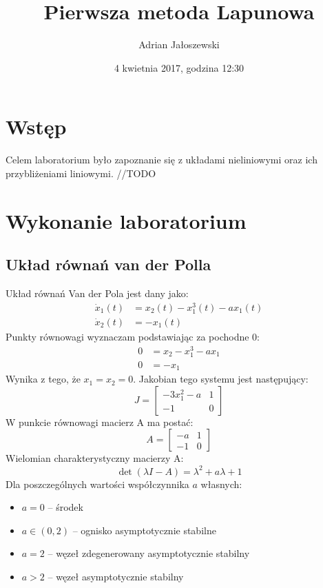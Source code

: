 \documentclass[a4paper, 10pt]{article}
\title{Pierwsza metoda Lapunowa}
\author{Adrian Jałoszewski}
\date{4 kwietnia 2017, godzina 12:30}
\begin{document}
	\maketitle
	\section{Wstęp}
		Celem laboratorium było zapoznanie się z układami nieliniowymi oraz ich przybliżeniami liniowymi. //TODO
	\section{Wykonanie laboratorium}
		\subsection{Układ równań van der Polla}
			Układ równań Van der Pola jest dany jako:
			$$
				\begin{aligned}
					\dot{x}_1(t) & = x_2(t) - x_1^3(t) - a x_1(t) \\
					\dot{x}_2(t) & = - x_1(t)
				\end{aligned}
			$$
			Punkty równowagi wyznaczam podstawiając za pochodne 0:
				$$
				\begin{aligned}
					0 & = x_2 - x_1^3 - a x_1 \\
					0 & = -x_1
				\end{aligned}
				$$
			Wynika z tego, że $x_1 = x_2 = 0$. Jakobian tego systemu jest następujący:
			$$
				J = \begin{bmatrix}
					-3x_1^2 -a & 1 \\
					-1 & 0
				\end{bmatrix}
			$$
			W punkcie równowagi macierz A ma postać:
			$$
				A = \begin{bmatrix}
				-a & 1 \\
				-1 & 0
				\end{bmatrix}
			$$
			Wielomian charakterystyczny macierzy A:
			$$
				\det(\lambda I - A) = \lambda ^ 2 + a \lambda + 1
			$$
			Dla poszczególnych wartości współczynnika $a$ własnych:
			\begin{itemize}
				\item[] $a = 0$ -- środek 
				\item[] $a \in (0, 2)$ -- ognisko asymptotycznie stabilne
				\item[] $a = 2$ -- węzeł zdegenerowany asymptotycznie stabilny
				\item[]	$a > 2$ -- węzeł asymptotycznie stabilny
			\end{itemize}
			
\end{document}
